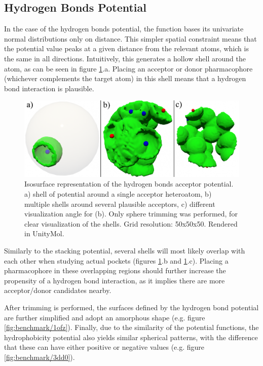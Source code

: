   \subsection{Hydrogen Bonds Potential}
    In the case of the hydrogen bonds potential, the function bases its univariate normal distributions only on distance. This simpler spatial constraint means that the potential value peaks at a given distance from the relevant atoms, which is the same in all directions. Intuitively, this generates a hollow shell around the atom, as can be seen in figure \ref{fig:results/visualize_hbonds}.a. Placing an acceptor or donor pharmacophore (whichever complements the target atom) in this shell means that a hydrogen bond interaction is plausible.

    \begin{figure}[H]
      \centering
      \includegraphics[width=1\textwidth]{figures/results/visualize_hbonds.png}
      \caption{\label{fig:results/visualize_hbonds} Isosurface representation of the hydrogen bonds acceptor potential. a) shell of potential around a single acceptor heteroatom, b) multiple shells around several plausible acceptors, c) different visualization angle for (b). Only sphere trimming was performed, for clear visualization of the shells. Grid resolution: 50x50x50. Rendered in UnityMol.}
    \end{figure}

    Similarly to the stacking potential, several shells will most likely overlap with each other when studying actual pockets (figures \ref{fig:results/visualize_hbonds}.b and \ref{fig:results/visualize_hbonds}.c). Placing a pharmacophore in these overlapping regions should further increase the propensity of a hydrogen bond interaction, as it implies there are more acceptor/donor candidates nearby.

    After trimming is performed, the surfaces defined by the hydrogen bond potential are further simplified and adopt an amorphous shape (e.g. figure \ref{fig:benchmark/1ofz}). Finally, due to the similarity of the potential functions, the hydrophobicity potential also yields similar spherical patterns, with the difference that these can have either positive or negative values (e.g. figure \ref{fig:benchmark/3dd0}).

